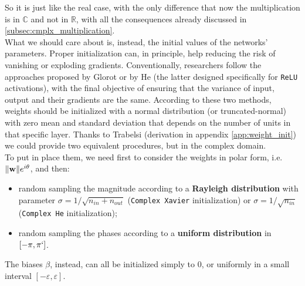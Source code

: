 \documentclass[../main.tex]{subfiles}
\begin{document}
So it is just like the real case, with the only difference that now the multiplication is in $\mathds{C}$ and not in $\mathds{R}$, with all the consequences already discussed in \ref{subsec:cmplx_multiplication}.\\
What we should care about is, instead, the initial values of the networks' parameters. Proper initialization can, in principle, help reducing the risk of vanishing or exploding gradients. Conventionally, researchers follow the approaches proposed by Glorot \cite{xavier_init} or by He \cite{he2015delving} (the latter designed specifically for \texttt{ReLU} activations), with the final objective of ensuring that the variance of input, output and their gradients are the same. According to these two methods, weights should be initialized with a normal distribution (or truncated-normal) with zero mean and standard deviation that depends on the number of units in that specific layer. Thanks to Trabelsi \cite{trabelsi2018deep} (derivation in appendix \ref{app:weight_init}) we could provide two equivalent procedures, but in the complex domain.\\
To put in place them, we need first to consider the weights in polar form, i.e. $\norm{\vb{w}}e^{i\theta}$, and then:
\begin{itemize}
	\item random sampling the magnitude according to a \textbf{Rayleigh distribution} with parameter $\sigma= 1 / \sqrt{n_{in} + n_{out}}$ (\texttt{Complex Xavier} initialization) or $\sigma= 1 / \sqrt{n_{in}}$ (\texttt{Complex He} initialization);
	\item random sampling the phases according to a \textbf{uniform distribution} in $[-\pi,\pi`]$.
\end{itemize}
The biases $\beta$, instead, can all be initialized simply to 0, or uniformly in a small interval $[-\varepsilon, \varepsilon]$.
\end{document}
